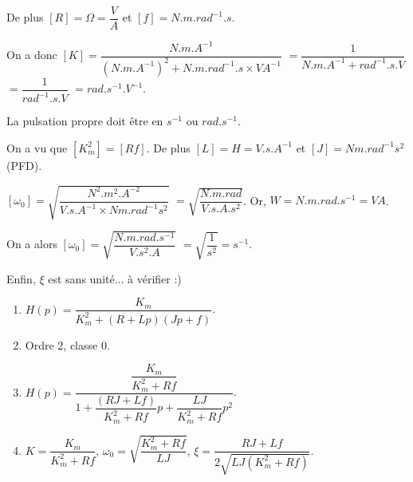 \begin{corrigebox}
De plus $[R]=\Omega = \dfrac{\si{V}}{\si{A}}$ et $[f]=\si{N.m.rad^{-1}.s}$.

On a donc 
$[K]=\dfrac{\si{N.m.A^{-1}}}
{(\si{N.m.A^{-1}})^2+\si{N.m.rad^{-1}.s}\times\si{VA^{-1}} }$
$=\dfrac{1}
{\si{N.m.A^{-1}}+\si{rad^{-1}.s.V} }$
$=\dfrac{1} {\si{rad^{-1}.s.V} }$
$= {\si{rad.s^{-1}.V^{-1}} }$. 

\vspace{.5cm}

La pulsation propre doit être en $\si{s^{-1}}$ ou $\si{rad.s^{-1}}$.

On a vu que $[K_m^2] = [Rf]$. De plus $[L] = H =  \si{V.s.A^{-1}}$ et 
$[J]=\si{Nm.rad^{-1}s^2}$ (PFD).

$[\omega_0]=\sqrt{
\dfrac{\si{N^2.m^2.A^{-2}}}
{\si{V.s.A^{-1}} \times \si{Nm.rad^{-1}s^2}}
}$
$=\sqrt{
\dfrac{\si{N.m.rad}}{\si{V.s.A.s^2}}
}$. 
Or, $\si{W}=\si{N.m.rad.s^{-1}}=\si{VA}$.

On a alors 
$[\omega_0]=\sqrt{
\dfrac{\si{N.m.rad.s^{-1}}}{\si{V.s^2.A}}
}$
$=\sqrt{
\dfrac{1}{\si{s^2}}
}=\si{s^{-1}}$.

Enfin, $\xi$ est sans unité... à vérifier :)

\begin{enumerate}
    \item $H(p)=\dfrac{K_m}{K_m^2 +\left(R +Lp\right) \left( Jp +f \right)} $.
    \item Ordre 2, classe 0.
    \item $H(p)=\dfrac{\dfrac{K_m}{K_m^2+ Rf}}{1 +\dfrac{\left(RJ  + Lf\right)}{K_m^2+ Rf} p + \dfrac{LJ}{K_m^2+ Rf}p^2 } $.
    \item $K = \dfrac{K_m}{K_m^2+ Rf}$,
$\omega_0=\sqrt{\dfrac{K_m^2+ Rf}{LJ}}$,
$\xi = \dfrac{RJ  + Lf}{2\sqrt{{LJ\left(K_m^2+ Rf\right)}}}$.
\end{enumerate}
\end{corrigebox}

